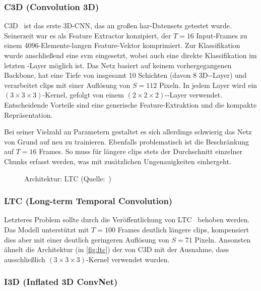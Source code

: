 \subsubsection*{C3D (Convolution 3D)}

C3D~\cite{Tran15} ist das erste 3D-CNN, das an großen \gls{har}-Datensets getestet wurde.
Seinerzeit war es als Feature Extractor konzipiert, der $T=16$ Input-Frames zu einem 4096-Elemente-langen Feature-Vektor komprimiert.
Zur Klassifikation wurde anschließend eine \gls{svm} eingesetzt, wobei auch eine direkte Klassifikation im letzten \fc-Layer möglich ist.
Das Netz basiert auf keinem vorhergegangenen Backbone, hat eine Tiefe von insgesamt 10 Schichten (davon 8 3D-\conv-Layer) und verarbeitet \glspl{clip} mit einer Auflösung von $S=112$ Pixeln.
In jedem Layer wird ein $(3 \times 3 \times 3)$-Kernel, gefolgt von einem $(2 \times 2 \times 2)$-\pool-Layer verwendet.
Entscheidende Vorteile sind eine generische Feature-Extraktion und die kompakte Repräsentation.

Bei seiner Vielzahl an Parametern gestaltet es sich allerdings schwierig das Netz von Grund auf neu zu trainieren.
Ebenfalls problematisch ist die Beschränkung auf $T=16$ Frames.
So muss für längere \glspl{clip} stets der Durchschnitt einzelner Chunks erfasst werden, was mit zusätzlichen Ungenauigkeiten einhergeht.

\begin{figure}[h!]
    \centering
    \caption{Architektur: LTC (Quelle:~\cite{Varol18})}
    \label{fig:ltc}
\end{figure}

\subsubsection*{LTC (Long-term Temporal Convolution)}

Letzteres Problem sollte durch die Veröffentlichung von LTC~\cite{Varol18} behoben werden.
Das Modell unterstützt mit $T=100$ Frames deutlich längere \glspl{clip}, kompensiert dies aber mit einer deutlich geringeren Auflösung von $S=71$ Pixeln.
Ansonsten ähnelt die Architektur (in \autoref{fig:ltc}) der von C3D mit der Ausnahme, dass ausschließlich $(3 \times 3 \times 3)$-Kernel verwendet wurden.

\subsubsection*{I3D (Inflated 3D ConvNet)}

